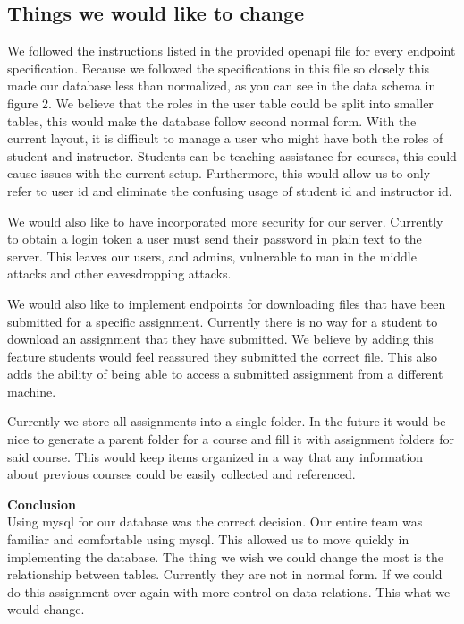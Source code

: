 \documentclass[a4paper]{article}
\begin{document}
\subsection{Things we would like to change}
We followed the instructions listed in the provided openapi file for every endpoint specification. Because we followed the specifications in this file so closely this made our database less than normalized, as you can see in the data schema in figure 2. We believe that the roles in the user table could be split into smaller tables, this would make the database follow second normal form. With the current layout, it is difficult to manage a user who might have both the roles of student and instructor. Students can be teaching assistance for courses, this could cause issues with the current setup. Furthermore, this would allow us to only refer to user id and eliminate the confusing usage of student id and instructor id.
\par
\noindent
We would also like to have incorporated more security for our server. Currently to obtain a login token a user must send their password in plain text to the server. This leaves our users, and admins, vulnerable to man in the middle attacks and other eavesdropping attacks.
\par
\noindent
We would also like to implement endpoints for downloading files that have been submitted for a specific assignment. Currently there is no way for a student to download an assignment that they have submitted. We believe by adding this feature students would feel reassured they submitted the correct file. This also adds the ability of being able to access a submitted assignment from a different machine.
\par
\noindent
Currently we store all assignments into a single folder. In the future it would be nice to generate a parent folder for a course and fill it with assignment folders for said course. This would keep items organized in a way that any information about previous courses could be easily collected and referenced.
\par
\noindent
\textbf{Conclusion}
\\[2mm]
Using mysql for our database was the correct decision. Our entire team was familiar and comfortable using mysql. This allowed us to move quickly in implementing the database. The thing we wish we could change the most is the relationship between tables. Currently they are not in normal form. If we could do this assignment over again with more control on data relations. This what we would change.
\end{document}
